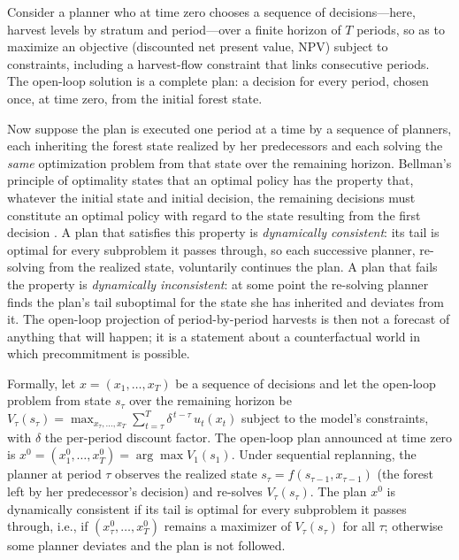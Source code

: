 \documentclass[12pt]{article}
\begin{document}
Consider a planner who at time zero chooses a sequence of decisions---here, harvest levels by stratum and period---over a finite horizon of \(T\) periods, so as to maximize an objective (discounted net present value, NPV) subject to constraints, including a harvest-flow constraint that links consecutive periods. The open-loop solution is a complete plan: a decision for every period, chosen once, at time zero, from the initial forest state.

Now suppose the plan is executed one period at a time by a sequence of planners, each inheriting the forest state realized by her predecessors and each solving the \emph{same} optimization problem from that state over the remaining horizon. Bellman's principle of optimality states that an optimal policy has the property that, whatever the initial state and initial decision, the remaining decisions must constitute an optimal policy with regard to the state resulting from the first decision \citep{bellman1957dynamic}. A plan that satisfies this property is \emph{dynamically consistent}: its tail is optimal for every subproblem it passes through, so each successive planner, re-solving from the realized state, voluntarily continues the plan. A plan that fails the property is \emph{dynamically inconsistent}: at some point the re-solving planner finds the plan's tail suboptimal for the state she has inherited and deviates from it. The open-loop projection of period-by-period harvests is then not a forecast of anything that will happen; it is a statement about a counterfactual world in which precommitment is possible.

Formally, let \(x = (x_1, \ldots, x_T)\) be a sequence of decisions and let the open-loop problem from state \(s_\tau\) over the remaining horizon be \(V_\tau(s_\tau) = \max_{x_\tau, \ldots, x_T} \sum_{t=\tau}^{T} \delta^{\,t-\tau} \, u_t(x_t)\) subject to the model's constraints, with \(\delta\) the per-period discount factor. The open-loop plan announced at time zero is \(x^{0} = (x_1^{0}, \ldots, x_T^{0}) = \arg\max V_1(s_1)\). Under sequential replanning, the planner at period \(\tau\) observes the realized state \(s_\tau = f(s_{\tau-1}, x_{\tau-1})\) (the forest left by her predecessor's decision) and re-solves \(V_\tau(s_\tau)\). The plan \(x^{0}\) is dynamically consistent if its tail is optimal for every subproblem it passes through, i.e., if \((x_\tau^{0}, \ldots, x_T^{0})\) remains a maximizer of \(V_\tau(s_\tau)\) for all \(\tau\); otherwise some planner deviates and the plan is not followed.
\end{document}
